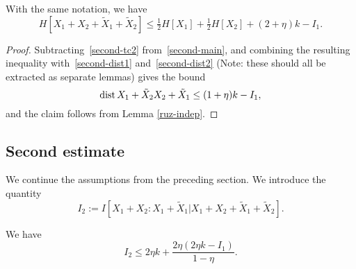 \begin{lemma}\label{foursum-bound}
  With the same notation, we have
  \begin{equation}
    \label{HS-bound}
    H[X_1+X_2+\tilde X_1+\tilde X_2] \le \tfrac{1}{2} H[X_1]+\tfrac{1}{2} H[X_2] + (2 + \eta) k - I_1.
  \end{equation}
\end{lemma}

\begin{proof}
  Subtracting~\eqref{second-tc2} from~\eqref{second-main}, and combining the resulting inequality with~\eqref{second-dist1} and~\eqref{second-dist2} (Note: these should all be extracted as separate lemmas) gives the bound
\[
  \operatorname{dist}{X_1+\tilde X_2}{X_2+\tilde X_1} \le (1 + \eta) k - I_1,
\]
and the claim follows from Lemma \ref{ruz-indep}.
\end{proof}


\subsection{Second estimate}

We continue the assumptions from the preceding section.
We introduce the quantity
$$ I_2 := I[ X_1+X_2 : X_1 + \tilde X_1 | X_1+X_2+\tilde X_1+\tilde X_2 ].$$

\begin{lemma}\label{second-estimate}
We have
$$ I_2 \leq 2 \eta k + \frac{2 \eta (2 \eta k - I_1)}{1 - \eta}.$$
\end{lemma}

